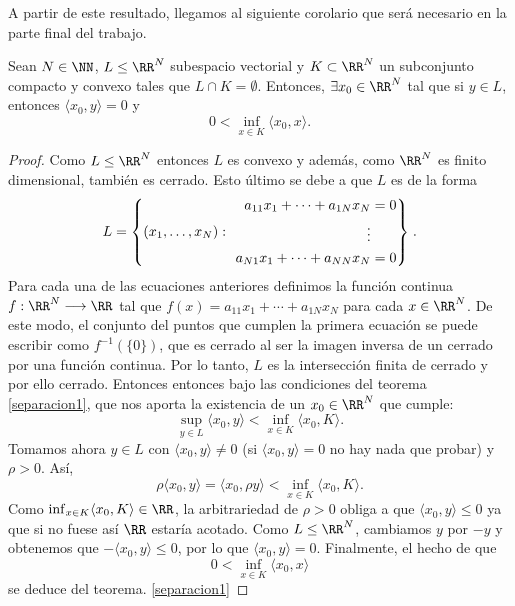 A partir de este resultado, llegamos al siguiente corolario que será necesario en la parte final del trabajo.

\begin{corolarioBox}\label{coroSep}
Sean $ N \in \NN $, $ L \leq \RR^N $ subespacio vectorial y $ K \subset \RR^N $ un subconjunto compacto y convexo tales que $ L \cap K = \emptyset $. Entonces, $ \exists x_0 \in \RR^N $ tal que si $ y \in L $, entonces $ \langle x_0, y\rangle = 0 $ y 
\[
0 < \inf_{ x \in K} \langle x_0, x\rangle.
\]
\end{corolarioBox} 
\begin{proof}
Como $ L \leq \RR^N $ entonces $ L $ es convexo y además, como $ \RR^N $ es finito dimensional, también es cerrado. Esto último se debe a que $ L $ es de la forma
\begin{equation*}
L = \left\{(x_1,\dots,x_N):\hspace{1mm}
\begin{rcases}
\begin{split}
a_{11}x_1+\cdots+a_{1N}x_N &= 0 \\
\vdots \\
a_{N1}x_1+\cdots+a_{NN}x_N &= 0
\end{split}
\end{rcases} \right. .
\end{equation*}
Para cada una de las ecuaciones anteriores definimos la función continua $ f:\RR^N \longrightarrow \RR $ tal que $ f(x) = a_{11}x_1+\cdots+a_{1N}x_N$ para cada $ x \in \RR^N $. De este modo, el conjunto del puntos que cumplen la primera ecuación se puede escribir como $ f^{-1}(\{0\}) $, que es cerrado al ser la imagen inversa de un cerrado por una función continua. Por lo tanto, $ L $ es la intersección finita de cerrado y por ello cerrado. Entonces entonces bajo las condiciones del teorema \ref{separacion1}, que nos aporta la existencia de un $ x_0 \in \RR^N $ que cumple:
\[
\sup_{y \in L} \langle x_0,y\rangle < \inf_{x\in K} \langle x_0,K\rangle.
\]
Tomamos ahora $ y \in L $ con $ \langle x_0,y\rangle \neq 0 $ (si $ \langle x_0,y\rangle = 0$ no hay nada que probar) y $ \rho > 0 $. Así,
\[
\rho \langle x_0,y\rangle = \langle x_0,\rho y\rangle < \inf_{x\in K} \langle x_0,K\rangle.
\]
Como $ \inf_{x\in K} \langle x_0,K\rangle \in \RR $, la arbitrariedad de $ \rho > 0 $ obliga a que $ \langle x_0,y\rangle \leq 0$ ya que si no fuese así $ \RR $ estaría acotado. Como $ L \leq \RR^N$, cambiamos $ y $ por $ -y $ y obtenemos que $ -\langle x_0,y\rangle \leq 0 $, por lo que $ \langle x_0,y\rangle = 0 $. Finalmente, el hecho de que 
\[
0 < \inf_{ x \in K} \langle x_0, x\rangle
\]
se deduce del teorema. \ref{separacion1}
\end{proof}


